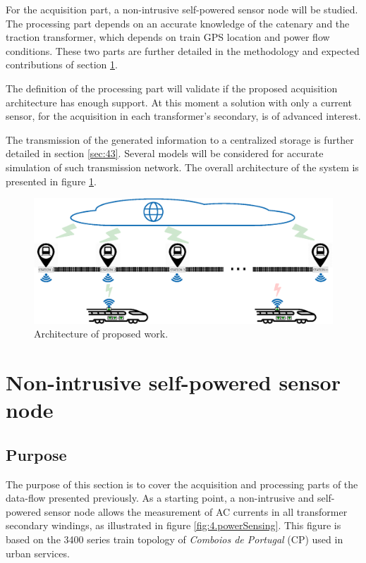 For the acquisition part, a non-intrusive self-powered sensor node will be studied. The processing part depends on an accurate knowledge of the catenary and the traction transformer, which depends on train GPS location and power flow conditions. These two parts are further detailed in the methodology and expected contributions of section \ref{sec:42}.

The definition of the processing part will validate if the proposed acquisition architecture has enough support. At this moment a solution with only a current sensor, for the acquisition in each transformer's secondary, is of advanced interest. 

The transmission of the generated information to a centralized storage is further detailed in section \ref{sec:43}. Several models will be considered for accurate simulation of such transmission network. The overall architecture of the system is presented in figure \ref{fig:41architecture}.

\begin{figure}[h!]
	\centering
	\includegraphics[width=1.0\textwidth,keepaspectratio]{figures/architecture}
	\caption{Architecture of proposed work.}
	\label{fig:41architecture}
\end{figure}







\section{Non-intrusive self-powered sensor node}
\label{sec:42}
\subsection{Purpose}

The purpose of this section is to cover the acquisition and processing parts of the data-flow presented previously. As a starting point, a non-intrusive and self-powered sensor node allows the measurement of AC currents in all transformer secondary windings, as illustrated in figure \ref{fig:4.powerSensing}. This figure is based on the 3400 series train topology of \textit{Comboios de Portugal} (CP) used in urban services.


